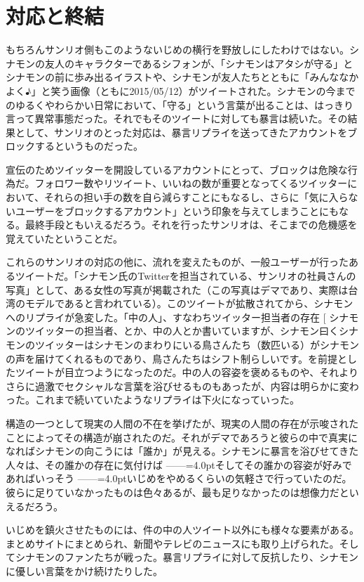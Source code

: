 \documentclass[b5j,twoside,twocolumn]{utarticle}
\makeatletter
\def\yakuchu{%
\@ifnextchar[\@xfootnote %
{\stepcounter{yakuchu}%
\protected@xdef\@thefnmark{\theyakuchu}%
\@footnotemark\@footnotetext}}
\makeatother
\begin{document}
\section*{対応と終結}
もちろんサンリオ側もこのようないじめの横行を野放しにしたわけではない。シナモンの友人のキャラクターであるシフォンが、「シナモンはアタシが守る」とシナモンの前に歩み出るイラストや、シナモンが友人たちとともに「みんななかよく♪」と笑う画像（ともに2015/05/12）がツイートされた。シナモンの今までのゆるくやわらかい日常において、「守る」という言葉が出ることは、はっきり言って異常事態だった。それでもそのツイートに対しても暴言は続いた。その結果として、サンリオのとった対応は、暴言リプライを送ってきたアカウントをブロックするというものだった。


宣伝のためツイッターを開設しているアカウントにとって、ブロックは危険な行為だ。フォロワー数やリツイート、いいねの数が重要となってくるツイッターにおいて、それらの担い手の数を自ら減らすことにもなるし、さらに「気に入らないユーザーをブロックするアカウント」という印象を与えてしまうことにもなる。最終手段ともいえるだろう。それを行ったサンリオは、そこまでの危機感を覚えていたということだ。


これらのサンリオの対応の他に、流れを変えたものが、一般ユーザーが行ったあるツイートだ。「シナモン氏のTwitterを担当されている、サンリオの社員さんの写真」として、ある女性の写真が掲載された（この写真はデマであり、実際は台湾のモデルであると言われている）。このツイートが拡散されてから、シナモンへのリプライが急変した。「中の人」、すなわちツイッター担当者の存在\yakuchu{シナモンのツイッターの担当者、とか、中の人とか書いていますが、シナモン曰くシナモンのツイッターはシナモンのまわりにいる鳥さんたち（数匹いる）がシナモンの声を届けてくれるものであり、鳥さんたちはシフト制らしいです。}を前提としたツイートが目立つようになったのだ。中の人の容姿を褒めるものや、それよりさらに過激でセクシャルな言葉を浴びせるものもあったが、内容は明らかに変わった。これまで続いていたようなリプライは下火になっていった。


構造の一つとして現実の人間の不在を挙げたが、現実の人間の存在が示唆されたことによってその構造が崩されたのだ。それがデマであろうと彼らの中で真実になればシナモンの向こうには「誰か」が見える。シナモンに暴言を浴びせてきた人々は、その誰かの存在に気付けば\tbaselineshift =2.5pt ------\tbaselineshift =4.0ptそしてその誰かの容姿が好みであればいっそう\tbaselineshift =2.5pt ------\tbaselineshift =4.0ptいじめをやめるくらいの気軽さで行っていたのだ。彼らに足りていなかったものは色々あるが、最も足りなかったのは想像力だといえるだろう。


いじめを鎮火させたものには、件の中の人ツイート以外にも様々な要素がある。まとめサイトにまとめられ、新聞やテレビのニュースにも取り上げられた。そしてシナモンのファンたちが戦った。暴言リプライに対して反抗したり、シナモンに優しい言葉をかけ続けたりした。
\end{document}
